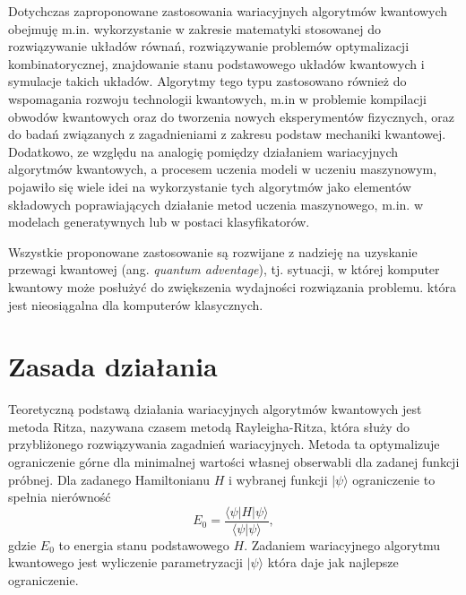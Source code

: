 \documentclass[a4paper,11pt]{article}
\newcommand{\ang}[1]{(ang. \emph{#1})}
\newcommand{\ket}[1]{| #1 \rangle}
\newcommand{\bra}[1]{\langle #1 |}
\newcommand{\braket}[2]{\bra{#2}{#1}\rangle}
\begin{document}
Dotychczas zaproponowane zastosowania wariacyjnych algorytmów kwantowych obejmuję m.in. wykorzystanie w zakresie matematyki stosowanej do rozwiązywanie układów równań, rozwiązywanie problemów optymalizacji kombinatorycznej, znajdowanie stanu podstawowego układów kwantowych i symulacje takich układów. Algorytmy tego typu zastosowano również do wspomagania rozwoju technologii kwantowych, m.in w problemie kompilacji obwodów kwantowych oraz do tworzenia nowych eksperymentów fizycznych, oraz do badań związanych z zagadnieniami z zakresu podstaw mechaniki kwantowej. Dodatkowo, ze względu na analogię pomiędzy działaniem wariacyjnych algorytmów kwantowych, a procesem uczenia modeli w uczeniu maszynowym, pojawiło się wiele idei na wykorzystanie tych algorytmów jako elementów składowych poprawiających działanie metod uczenia maszynowego, m.in. w modelach generatywnych lub w postaci klasyfikatorów.

Wszystkie proponowane zastosowanie są rozwijane z nadzieję na uzyskanie przewagi kwantowej \ang{quantum adventage}, tj. sytuacji, w której komputer kwantowy może posłużyć do zwiększenia wydajności rozwiązania problemu. która jest nieosiągalna dla komputerów klasycznych.



\section{Zasada działania}\label{zasada-dzialania}

Teoretyczną podstawą działania wariacyjnych algorytmów kwantowych jest metoda Ritza, nazywana czasem metodą Rayleigha-Ritza, która służy do przybliżonego rozwiązywania zagadnień wariacyjnych. Metoda ta optymalizuje ograniczenie górne dla minimalnej wartości własnej obserwabli dla zadanej funkcji próbnej. Dla zadanego Hamiltonianu $H$ i wybranej funkcji $\ket{\psi}$ ograniczenie to spełnia nierówność
\begin{equation}
	E_0 = \frac{\bra{\psi} H \ket{\psi}}{\braket{\psi}{\psi}},
\end{equation}
gdzie $E_0$ to energia stanu podstawowego $H$. Zadaniem wariacyjnego algorytmu kwantowego jest wyliczenie parametryzacji  $\ket{\psi}$ która daje jak najlepsze ograniczenie.
\end{document}
